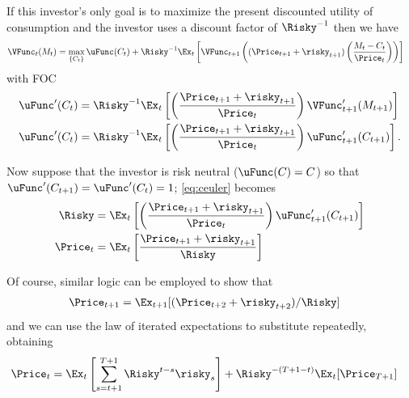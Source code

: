 \documentclass{handout}
\begin{document}
If this investor's only goal is to maximize the present discounted utility of
consumption and the investor uses a discount factor of $\Risky^{-1}$ then we have
\begin{equation}\begin{gathered}\begin{aligned}
        \VFunc_{t}(M_{t}) & =  \max_{\{C_{t}\}} \uFunc(C_{t})+\Risky^{-1} \Ex_{t}\left[\VFunc_{t+1}\left((\Price_{t+1}+\risky_{t+1})\left(\frac{M_{t}-C_{t}}{\Price_{t}}\right)\right)\right]
\end{aligned}\end{gathered}\end{equation}
with FOC
\begin{equation}\begin{gathered}\begin{aligned}
        \uFunc^{\prime}(C_{t}) & =  \Risky^{-1} \Ex_{t}\left[\left(\frac{\Price_{t+1}+\risky_{t+1}}{\Price_{t}}\right)\VFunc^{\prime}_{t+1}(M_{t+1})\right] 
\\  \uFunc^{\prime}(C_{t}) & =  \Risky^{-1} \Ex_{t}\left[\left(\frac{\Price_{t+1}+\risky_{t+1}}{\Price_{t}}\right)\uFunc^{\prime}_{t+1}(C_{t+1})\right] \label{eq:ceuler}.
\end{aligned}\end{gathered}\end{equation}

Now suppose that the investor is risk neutral ($\uFunc(C) = C$) so that $\uFunc^{\prime}(C_{t+1})=\uFunc^{\prime}(C_{t})=1$; \eqref{eq:ceuler} becomes
\begin{equation}\begin{gathered}\begin{aligned}
        \Risky  & =   \Ex_{t}\left[\left(\frac{\Price_{t+1}+\risky_{t+1}}{\Price_{t}}\right)\uFunc^{\prime}_{t+1}(C_{t+1})\right] 
\\  \Price_{t} & =  \Ex_{t}\left[\frac{\Price_{t+1}+\risky_{t+1}}{\Risky } \right] \label{eq:pteq}
\end{aligned}\end{gathered}\end{equation}

Of course, similar logic can be employed to show that 
\begin{equation}\begin{gathered}\begin{aligned}
        \Price_{t+1} & =  \Ex_{t+1}[(\Price_{t+2}+\risky_{t+2})/\Risky ]
\end{aligned}\end{gathered}\end{equation}
and we can use the law of iterated expectations to substitute repeatedly,
obtaining
\begin{equation}\begin{gathered}\begin{aligned}
        \Price_{t} & =  \Ex_{t}\left[\sum_{s=t+1}^{T+1} \Risky^{t-s}\risky_{s}\right] + \Risky^{-(T+1-t)}\Ex_{t}[\Price_{T+1}]
\end{aligned}\end{gathered}\end{equation}
\end{document}

